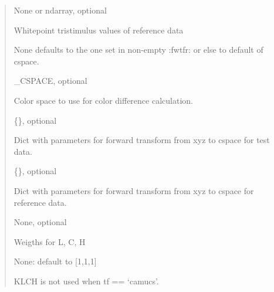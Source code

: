 \documentclass[letterpaper,10pt,english]{sphinxmanual}
\begin{document}
\begin{fulllineitems}
\begin{description}
\begin{quote}
\begin{description}
\item[{xyzwr}] \leavevmode
\begin{DUlineblock}{0em}
\item[] None or ndarray, optional
\item[]
\begin{DUlineblock}{\DUlineblockindent}
\item[] Whitepoint tristimulus values of reference data
\item[]
\begin{DUlineblock}{\DUlineblockindent}
\item[] None defaults to the one set in non-empty :fwtfr: 
or else to default of cspace.
\end{DUlineblock}
\end{DUlineblock}
\end{DUlineblock}

\item[{tf}] \leavevmode
\begin{DUlineblock}{0em}
\item[] \_CSPACE, optional
\item[] Color space to use for color difference calculation.
\end{DUlineblock}

\item[{fwtft}] \leavevmode
\begin{DUlineblock}{0em}
\item[] \{\}, optional
\item[] Dict with parameters for forward transform 
from xyz to cspace for test data.
\end{DUlineblock}

\item[{fwtfr}] \leavevmode
\begin{DUlineblock}{0em}
\item[] \{\}, optional 
\item[] Dict with parameters for forward transform 
from xyz to cspace for reference data.
\end{DUlineblock}

\item[{KLCH}] \leavevmode
\begin{DUlineblock}{0em}
\item[] None, optional
\item[] Weigths for L, C, H 
\item[] None: default to {[}1,1,1{]} 
\item[] KLCH is not used when tf == ‘camucs’.
\end{DUlineblock}


\end{description}
\end{quote}
\end{description}
\end{fulllineitems}
\end{document}
